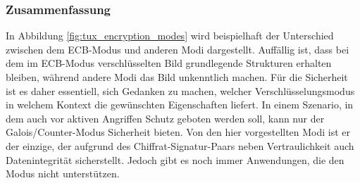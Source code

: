 \subsubsection{Zusammenfassung}
In Abbildung \ref{fig:tux_encryption_modes} wird beispielhaft der Unterschied zwischen dem ECB-Modus und anderen Modi dargestellt. Auffällig ist, dass bei dem im ECB-Modus verschlüsselten Bild grundlegende Strukturen erhalten bleiben, während andere Modi das Bild unkenntlich machen. Für die Sicherheit ist es daher essentiell, sich Gedanken zu machen, welcher Verschlüsselungsmodus in welchem Kontext die gewünschten Eigenschaften liefert. In einem Szenario, in dem auch vor aktiven Angriffen Schutz geboten werden soll, kann nur der Galois/Counter-Modus Sicherheit bieten.
Von den hier vorgestellten Modi ist er der einzige, der aufgrund des Chiffrat-Signatur-Paars neben Vertraulichkeit auch Datenintegrität sicherstellt. Jedoch gibt es noch immer Anwendungen, die den Modus
nicht unterstützen.
